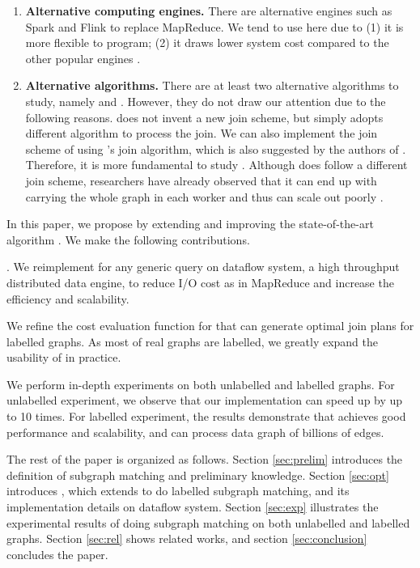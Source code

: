 \begin{enumerate}
    \item \textbf{Alternative computing engines.} There are alternative engines such as Spark \cite{spark} and Flink \cite{flink} to replace MapReduce. We tend to use \timely here due to (1) it is more flexible to program; (2) it draws lower system cost compared to the other popular engines \cite{McSherry2015}.
    \item \textbf{Alternative algorithms.} There are at least two alternative algorithms to study, namely \bigjoin and \multiwayjoin. However, they do not draw our attention due to the following reasons. \bigjoin does not invent a new join scheme, but simply adopts different algorithm to process the join. We can also implement the join scheme of \cliquejoin using \bigjoin's join algorithm, which is also suggested by the authors of \bigjoin \cite{Ammar2018}. Therefore, it is more fundamental to study \cliquejoin. Although \multiwayjoin does follow a different join scheme, researchers have already observed that it can end up with carrying the whole graph in each worker and thus can scale out poorly \cite{Lai2016, Ammar2018}.   
\end{enumerate}

 In this paper, we propose \gencliqjoin by extending and improving the state-of-the-art algorithm \cliquejoin. We make the following contributions.

. We reimplement \cliquejoin for any generic query on \timely dataflow system, a high throughput distributed data engine, to reduce I/O cost as in MapReduce and increase the efficiency and scalability. 

 We refine the cost evaluation function for \cliquejoin that can generate optimal join plans for labelled graphs. As most of real graphs are labelled, we greatly expand the usability of \cliquejoin in practice.

 We perform in-depth experiments on both unlabelled and labelled graphs. For unlabelled experiment, we observe that our implementation can speed up \cliquejoin by up to 10 times. For labelled experiment, the results demonstrate that \gencliqjoin achieves good performance and scalability, and can process data graph of billions of edges.

 The rest of the paper is organized as follows. Section \ref{sec:prelim} introduces the definition of subgraph matching and preliminary knowledge. Section \ref{sec:opt} introduces \gencliqjoin, which extends \cliquejoin to do labelled subgraph matching, and its implementation details on \timely dataflow system. Section \ref{sec:exp} illustrates the experimental results of doing subgraph matching on both unlabelled and labelled graphs. Section \ref{sec:rel} shows related works, and section \ref{sec:conclusion} concludes the paper.